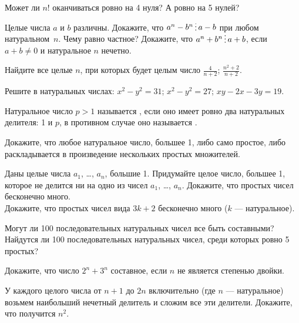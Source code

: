 \documentclass[12pt,a4paper]{article}
\begin{document}



Может ли $n!$ оканчиваться ровно на 4 нуля? А ровно на 5 нулей?


Целые числа $a$ и $b$ различны. Докажите, что $a^n-b^n\del a-b$
при любом натуральном~$n$.
Чему равно частное?
 Докажите, что $a^n+b^n\del a+b$, если $a+b\ne0$ и
натуральное $n$ нечетно.

Найдите все целые $n$, при которых будет целым число  $\frac4{n+2}$;  $\frac{n^2+2}{n+2}$.

Решите в натуральных числах:  $x^2-y^2=31$;  $x^2-y^2=27$;
 $xy - 2x - 3y = 19$.


Натуральное число $p>1$ называется , если оно имеет ровно два
натуральных делителя: 1 и $p$, в противном случае оно
называется .

 Докажите, что любое натуральное число, большее 1,
либо само простое, либо раскладывается в произведение нескольких
простых множителей.


Даны целые числа $a_1$, \ldots, $a_n$, большие 1.
Придумайте целое число, большее 1, которое не делится ни на одно из чисел
$a_1$, \ldots, $a_n$.
 Докажите, что простых чисел бесконечно много.\\
 Докажите, что простых чисел вида $3k+2$ бесконечно много
($k$ --- натуральное).

Могут ли 100 последовательных натуральных чисел
все быть составными?\\
Найдутся ли 100 последовательных натуральных чисел,
среди которых ровно 5 простых?

Докажите, что число $2^n+3^n$ составное, если $n$ не является степенью двойки.

%
%



У каждого целого числа от $n+1$ до $2n$ включительно
(где $n$ --- натуральное) возьмем наибольший нечетный
делитель и сложим все эти делители. Докажите, что получится $n^2$.
\end{document}
